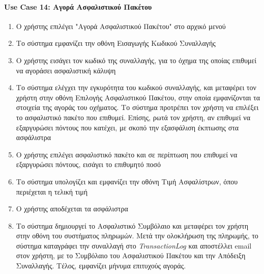 \documentclass{../ol-softwaremanual}
\begin{document}
	\paragraph{\en Use Case 14: \gr Αγορά Ασφαλιστικού Πακέτου}
	\begin{enumerate}
		\item Ο χρήστης επιλέγει \en"\gr Αγορά Ασφαλιστικού Πακέτου\en" \gr στο αρχικό μενού
		\item Το σύστημα εμφανίζει την οθόνη Εισαγωγής Κωδικού Συναλλαγής
		\item Ο χρήστης εισάγει τον κωδικό της συναλλαγής, για το όχημα της οποίας επιθυμεί να αγοράσει ασφαλιστική κάλυψη
		\item Το σύστημα ελέγχει την εγκυρότητα του κωδικού συναλλαγής, και μεταφέρει τον χρήστη στην οθόνη Επιλογής Ασφαλιστικού Πακέτου, στην οποία εμφανίζονται τα στοιχεία της αγοράς του οχήματος. Το σύστημα προτρέπει τον χρήστη να επιλέξει το ασφαλιστικό πακέτο που επιθυμεί. Επίσης, ρωτά τον χρήστη, αν επιθυμεί να εξαργυρώσει πόντους που κατέχει, με σκοπό την εξασφάλιση έκπτωσης στα ασφάλιστρα
		\item Ο χρήστης επιλέγει ασφαλιστικό πακέτο και σε περίπτωση που επιθυμεί να εξαργυρώσει πόντους, εισάγει το επιθυμητό ποσό
		\item Το σύστημα υπολογίζει και εμφανίζει την οθόνη Τιμή Ασφαλίστρων, όπου περιέχεται η τελική τιμή 
		\item Ο χρήστης αποδέχεται τα ασφάλιστρα
		\item Το σύστημα δημιουργεί το Ασφαλιστικό Συμβόλαιο και μεταφέρει τον χρήστη στην οθόνη του συστήματος πληρωμών. Μετά την ολοκλήρωση της πληρωμής, το σύστημα καταγράφει την συναλλαγή στο \en \textit{TransactionLog} \gr και αποστέλλει \en email \gr στον χρήστη, με το Συμβόλαιο του Ασφαλιστικού Πακέτου και την Απόδειξη Συναλλαγής. Τέλος, εμφανίζει μήνυμα επιτυχούς αγοράς.		
	\end{enumerate}

	\paragraph{}

	
\end{document}
